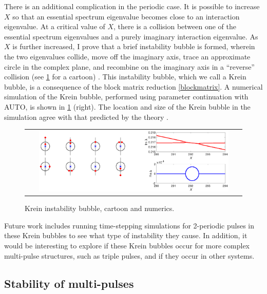 \documentclass[12pt,reqno,oneside]{article}
\theoremstyle{definition}
\theoremstyle{remark}
\begin{document}
There is an additional complication in the periodic case. It is possible to increase $X$ so that an essential spectrum eigenvalue becomes close to an interaction eigenvalue. At a critical value of $X$, there is a collision between one of the essential spectrum eigenvalues and a purely imaginary interaction eigenvalue. As $X$ is further increased, I prove that a brief instability bubble is formed, wherein the two eigenvalues collide, move off the imaginary axis, trace an approximate circle in the complex plane, and recombine on the imaginary axis in a ``reverse''  collision (see \cref{fig:kreinbubble1} for a cartoon) \cite{ParkerKdV}. This instability bubble, which we call a Krein bubble, is a consequence of the block matrix reduction \cref{blockmatrix}. A numerical simulation of the Krein bubble, performed using parameter continuation with AUTO, is shown in \cref{fig:kreinbubble1} (right). The location and size of the Krein bubble in the simulation agree with that predicted by the theory \cite{ParkerKdV}.
\begin{figure}[H]
\begin{tabular}{c}
\includegraphics[width=0.9\textwidth]{images/KreinBubbleBoth}
\end{tabular}
\caption{Krein instability bubble, cartoon and numerics.}
\label{fig:kreinbubble1}
\end{figure}
Future work includes running time-stepping simulations for 2-periodic pulses in these Krein bubbles to see what type of instability they cause. In addition, it would be interesting to explore if these Krein bubbles occur for more complex multi-pulse structures, such as triple pulses, and if they occur in other systems.

\subsection{Stability of multi-pulses}
\end{document}
